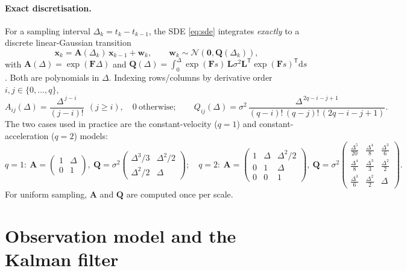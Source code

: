\documentclass[11pt]{article}
\newcommand{\Norm}{\mathcal{N}}
\newcommand{\T}{^{\mathsf{T}}}
\newcommand{\dd}{\mathrm{d}}
\begin{document}
\paragraph{Exact discretisation.}
For a sampling interval $\Delta_k=t_k-t_{k-1}$, the SDE \eqref{eq:sde} integrates
\emph{exactly} to a discrete linear-Gaussian transition
\begin{equation}
  \bm{x}_k = \bm{A}(\Delta_k)\,\bm{x}_{k-1} + \bm{w}_k,
  \qquad \bm{w}_k\sim\Norm(\bm 0,\bm{Q}(\Delta_k)),
  \label{eq:disc}
\end{equation}
with $\bm{A}(\Delta)=\exp(\bm{F}\Delta)$ and
$\bm{Q}(\Delta)=\int_0^{\Delta}\!\exp(\bm{F}s)\,\bm{L}\sigma^2\bm{L}\T\exp(\bm{F}s)\T\dd s$.
Both are polynomials in $\Delta$. Indexing rows/columns by derivative order
$i,j\in\{0,\dots,q\}$,
\begin{equation}
  A_{ij}(\Delta)=\frac{\Delta^{\,j-i}}{(j-i)!}\ \ (j\ge i),\quad 0\ \text{otherwise};
  \qquad
  Q_{ij}(\Delta)=\sigma^2\,\frac{\Delta^{\,2q-i-j+1}}{(q-i)!\,(q-j)!\,(2q-i-j+1)} .
  \label{eq:AQ}
\end{equation}
The two cases used in practice are the constant-velocity ($q{=}1$) and
constant-acceleration ($q{=}2$) models:
\begin{equation*}
  q{=}1:\
  \bm{A}=\begin{pmatrix}1&\Delta\\0&1\end{pmatrix},\
  \bm{Q}=\sigma^2\begin{pmatrix}\Delta^3/3&\Delta^2/2\\\Delta^2/2&\Delta\end{pmatrix};
  \quad
  q{=}2:\
  \bm{A}=\begin{pmatrix}1&\Delta&\Delta^2/2\\0&1&\Delta\\0&0&1\end{pmatrix},\
  \bm{Q}=\sigma^2\!\begin{pmatrix}\tfrac{\Delta^5}{20}&\tfrac{\Delta^4}{8}&\tfrac{\Delta^3}{6}\\[2pt]
  \tfrac{\Delta^4}{8}&\tfrac{\Delta^3}{3}&\tfrac{\Delta^2}{2}\\[2pt]
  \tfrac{\Delta^3}{6}&\tfrac{\Delta^2}{2}&\Delta\end{pmatrix}.
\end{equation*}
For uniform sampling, $\bm{A}$ and $\bm{Q}$ are computed once per scale.

\section{Observation model and the Kalman filter}
\label{sec:kf}
\end{document}
